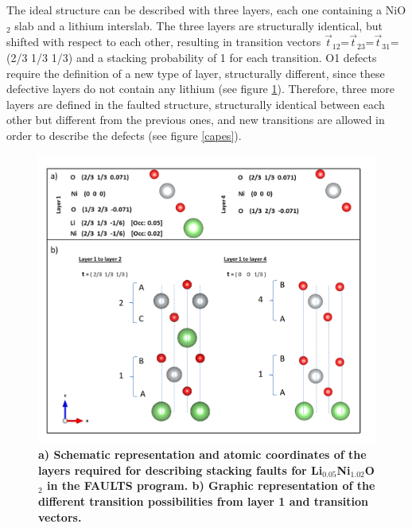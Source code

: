 The ideal structure can be described with three layers, each one containing a NiO$_{2}$ slab and a lithium interslab. The three layers are structurally identical, but shifted with respect to each other, resulting in transition vectors $\vec{t}_{12}$=$\vec{t}_{23}$=$\vec{t}_{31}$=(2/3 1/3 1/3) and a stacking probability of 1 for each transition. O1 defects require the definition of a new type of layer, structurally different, since these defective layers do not contain any lithium (see figure \ref{esquemacapes}). Therefore, three more layers are defined in the faulted structure, structurally identical between each other but different from the previous ones, and new transitions are allowed  in order to describe the defects (see figure \ref{capes}).

\begin{figure}
\begin{center}
\includegraphics [width=6in]{description.jpg}
\caption{\bf  a) Schematic representation and atomic coordinates of the layers required for describing stacking faults for Li$_{0.05}$Ni$_{1.02}$O$_{2}$ in the FAULTS program. b) Graphic representation of the different transition possibilities from layer 1 and transition vectors.}
\label{esquemacapes}
\end{center}
\end{figure}

